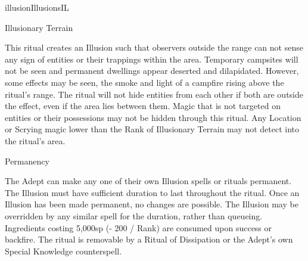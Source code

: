 \begin{college}[1.4]{illusion}{Illusions}{IL}
\begin{ritual}[R-2]{Illusionary Terrain}
\begin{effects}
This ritual creates an Illusion such that observers outside the range
can not sense any sign of entities or their trappings within the area.
Temporary campsites will not be seen and permanent dwellings appear
deserted and dilapidated. However, some effects may be seen, \eg the
smoke and light of a campfire rising above the ritual's range.  The
ritual will not hide entities from each other if both are outside the
effect, even if the area lies between them. Magic that is not targeted
on entities or their possessions may not be hidden through this
ritual.  Any Location or Scrying magic lower than the Rank of
Illusionary Terrain may not detect into the ritual's area.
\end{effects}
\end{ritual}

\begin{ritual}[R-3]{Permanency}

\begin{effects}
The Adept can make any one of their own Illusion spells or rituals
permanent. The Illusion must have sufficient duration to last
throughout the ritual. Once an Illusion has been made permanent, no
changes are possible. The Illusion may be overridden by any similar
spell for the duration, rather than queueing. Ingredients costing
5,000sp (- 200 / Rank) are consumed upon success or backfire. The
ritual is removable by a Ritual of Dissipation or the Adept's own
Special Knowledge counterspell.
\end{effects}
\end{ritual}
\end{college}
